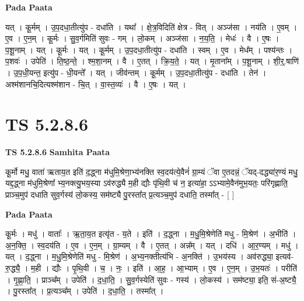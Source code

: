 \documentclass[17pt]{extarticle}
\begin{document}
\textbf{Pada Paata} \newline

यत् । कू॒र्मम् । उ॒प॒दधा॒तीत्यु॑प - दधा॑ति । यथा᳚ । क्षे॒त्र॒विदिति॑ क्षेत्र - वित् । अञ्ज॑सा । नय॑ति । ए॒वम् । ए॒व । ए॒न॒म् । कू॒र्मः । सु॒व॒र्गमिति॑ सुवः - गम् । लो॒कम् । अञ्ज॑सा । न॒य॒ति॒ । मेधः॑ । वै । ए॒षः । प॒शू॒नाम् । यत् । कू॒र्मः । यत् । कू॒र्मम् । उ॒प॒दधा॒तीत्यु॑प - दधा॑ति । स्वम् । ए॒व । मेध᳚म् । पश्य॑न्तः । प॒शवः॑ । उपेति॑ । ति॒ष्ठ॒न्ते॒ । श्म॒शा॒नम् । वै । ए॒तत् । क्रि॒य॒ते॒ । यत् । मृ॒ताना᳚म् । प॒शू॒नाम् । शी॒र्॒.षाणि॑ । उ॒प॒धी॒यन्त॒ इत्यु॑प - धी॒यन्ते᳚ । यत् । जीव॑न्तम् । कू॒र्मम् । उ॒प॒दधा॒तीत्यु॑प - दधा॑ति । तेन॑ । अश्म॑शानचि॒दित्यश्म॑शान - चि॒त् । वा॒स्त॒व्यः॑ । वै । ए॒षः । यत् ।  \newline





\section{ TS 5.2.8.6 }

\textbf{TS 5.2.8.6 } \newline
\textbf{Samhita Paata} \newline

कू॒र्मो मधु॒ वाता॑ ऋताय॒त इति॑ द॒द्ध्ना म॑धुमि॒श्रेणा॒भ्य॑नक्ति स्व॒दय॑त्ये॒वैनं॑ ग्रा॒म्यं ॅवा ए॒तदन्नं॒ ॅयद्-दद्ध्या॑र॒ण्यं मधु॒ यद्द॒द्ध्ना म॑धुमि॒श्रेणा᳚ भ्य॒नक्त्यु॒भय॒स्या ऽव॑रुद्ध्यै म॒ही द्यौः पृ॑थि॒वी च॑ न॒ इत्या॑हा॒ ऽऽभ्यामे॒वैन॑मुभ॒यतः॒ परि॑गृह्णाति॒ प्राञ्च॒मुप॑ दधाति सुव॒र्गस्य॑ लो॒कस्य॒ सम॑ष्ट्यै पु॒रस्ता᳚त् प्र॒त्यञ्च॒मुप॑ दधाति॒ तस्मा᳚त् - [  ] \newline

\textbf{Pada Paata} \newline

कू॒र्मः । मधु॑ । वाताः᳚ । ऋ॒ता॒य॒त इत्यृ॑त - य॒ते । इति॑ । द॒द्ध्ना । म॒धु॒मि॒श्रेणेति॑ मधु - मि॒श्रेण॑ । अ॒भीति॑ । अ॒न॒क्ति॒ । स्व॒दय॑ति । ए॒व । ए॒न॒म् । ग्रा॒म्यम् । वै । ए॒तत् । अन्न᳚म् । यत् । दधि॑ । आ॒र॒ण्यम् । मधु॑ । यत् । द॒द्ध्ना । म॒धु॒मि॒श्रेणेति॑ मधु - मि॒श्रेण॑ । अ॒भ्य॒नक्तीत्य॑भि - अ॒नक्ति॑ । उ॒भय॑स्य । अव॑रुद्ध्या॒ इत्यव॑-रु॒द्ध्यै॒ । म॒ही । द्यौः । पृ॒थि॒वी । च॒ । नः॒ । इति॑ । आ॒ह॒ । आ॒भ्याम् । ए॒व । ए॒न॒म् । उ॒भ॒यतः॑ । परीति॑ । गृ॒ह्णा॒ति॒ । प्राञ्च᳚म् । उपेति॑ । द॒धा॒ति॒ । सु॒व॒र्गस्येति॑ सुवः - गस्य॑ । लो॒कस्य॑ । सम॑ष्ट्या॒ इति॒ सं-अ॒ष्ट्यै॒ । पु॒रस्ता᳚त् । प्र॒त्यञ्च᳚म् । उपेति॑ । द॒धा॒ति॒ । तस्मा᳚त् ।  \newline
\end{document}
